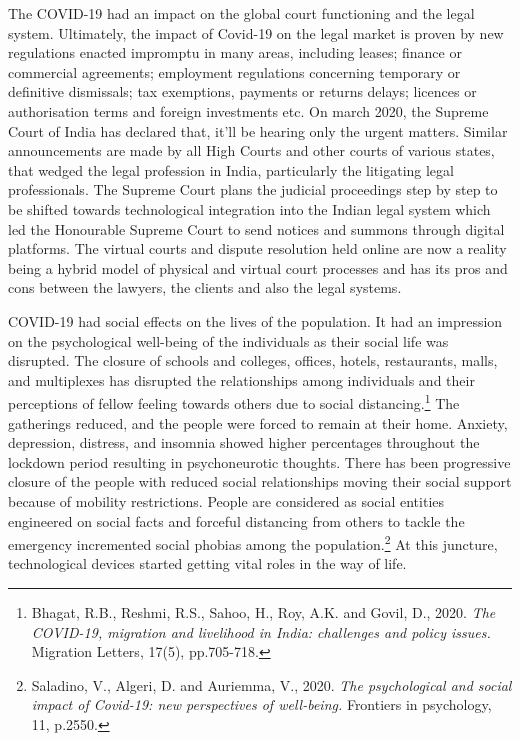 \begin{multicols}{2}
\noi
The COVID-19 had an impact on the global court functioning and the legal system.
Ultimately, the impact of Covid-19 on the legal market is proven by new regulations enacted
impromptu in many areas, including leases; finance or commercial agreements; employment
regulations concerning temporary or definitive dismissals; tax exemptions, payments or
returns delays; licences or authorisation terms and foreign investments etc. On march 2020,
the Supreme Court of India has declared that, it'll be hearing only the urgent matters. Similar
announcements are made by all High Courts and other courts of various states, that wedged the legal profession in India, particularly the litigating legal professionals. The Supreme
Court plans the judicial proceedings step by step to be shifted towards technological
integration into the Indian legal system which led the Honourable Supreme Court to send
notices and summons through digital platforms. The virtual courts and dispute resolution held
online are now a reality being a hybrid model of physical and virtual court processes and has
its pros and cons between the lawyers, the clients and also the legal systems.


\noi
COVID-19 had social effects on the lives of the population. It had an impression on the
psychological well-being of the individuals as their social life was disrupted. The closure of
schools and colleges, offices, hotels, restaurants, malls, and multiplexes has disrupted the
relationships among individuals and their perceptions of fellow feeling towards others due to
social distancing.\footnote{Bhagat, R.B., Reshmi, R.S., Sahoo, H., Roy, A.K. and Govil, D., 2020. \textit{The COVID-19, migration and livelihood in India: challenges and policy issues.} Migration Letters, 17(5), pp.705-718.} The gatherings reduced, and the people were forced to remain at their
home. Anxiety, depression, distress, and insomnia showed higher percentages throughout the
lockdown period resulting in psychoneurotic thoughts. There has been progressive closure of
the people with reduced social relationships moving their social support because of mobility
restrictions. People are considered as social entities engineered on social facts and forceful
distancing from others to tackle the emergency incremented social phobias among the
population.\footnote{Saladino, V., Algeri, D. and Auriemma, V., 2020. \textit{The psychological and social impact of Covid-19: new perspectives of well-being.} Frontiers in psychology, 11, p.2550.} At this juncture, technological devices started getting vital roles in the way of
life.


\end{multicols}
